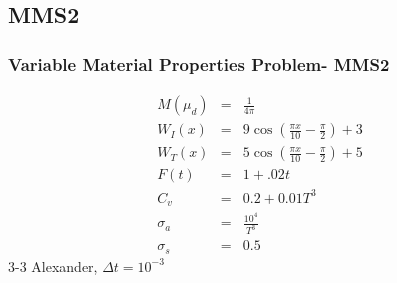 \documentclass{beamer}
\newcommand{\bea}{\begin{eqnarray*}}  %
\newcommand{\eea}{\end{eqnarray*}}
\begin{document}
\subsection{MMS2}
\begin{frame}
\frametitle{Variable Material Properties Problem- MMS2}
\bea
M(\mu_d) &=& \frac{1}{4\pi} \\
W_I(x) &=& 9 \cos\left( \frac{\pi x}{10} - \frac{\pi}{2} \right) + 3  \\
W_T(x) &=&  5 \cos\left( \frac{\pi x}{10} - \frac{\pi}{2} \right) + 5 \\
F(t) &=&  1 + .02t \\
C_v &=& 0.2 + 0.01 T^3 \\
\sigma_a &=& \frac{10^4}{T^3} \\
\sigma_s &=& 0.5 
\eea
3-3 Alexander, $\Delta t = 10^{-3}$
\end{frame}
\end{document}
